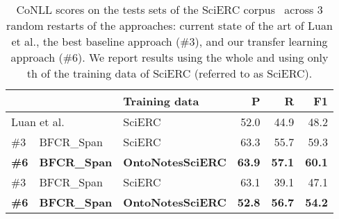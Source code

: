 \documentclass[runningheads]{llncs}
\begin{document}
\begin{table}[tb]
\centering
\small
\caption{CoNLL scores on the tests sets of the SciERC corpus~\cite{Luan2018MultiTaskIO} across 3 random restarts of the approaches: current state of the art of Luan et al., 
the best baseline approach (\#3), and our transfer learning approach (\#6). We report results using the whole and using only th of the training data of SciERC (referred to as SciERC).}
\label{tab:coref_results_scierc}
\begin{tabular}{lll|rrr}
  &           & Training data  & P       & R      & F1     \\ \hline
\multicolumn{2}{l}{ Luan et al.~\cite{Luan2018MultiTaskIO}} & SciERC 
 &  52.0 & 44.9 & 48.2 \\ \hline
\#3 & BFCR\_Span & SciERC 
 & 63.3	& 55.7	& 59.3 \\ 
\textbf{\#6} & \textbf{BFCR\_Span} & \textbf{OntoNotesSciERC}
& \textbf{63.9}	& \textbf{57.1}	& \textbf{60.1} \\
\hline
\#3 & BFCR\_Span & SciERC 
& 63.1	& 39.1	& 47.1 \\
\textbf{\#6} & \textbf{BFCR\_Span} & \textbf{OntoNotesSciERC} & \textbf{52.8}	& \textbf{56.7}	& \textbf{54.2} \\
\end{tabular}
\vspace{-1em}
\end{table}


\begin{comment}
\begin{table}[tb]
\centering
\small
\caption{
Per domain and overall performance results of the best transfer learning approach (\#6) on the test sets of the STM corpus across five-fold cross validation, i.e.
CoNLL precision (P), recall (R) and F1.}
\label{tab:results_per_domain}
\begin{tabular}{l|r|r|r|r|r|r|r|r|r|r|r}
   & Agr  & Ast  & Bio  & Che  & CS   & ES   & Eng  & MS   & Mat  & Med & Overall  \\ \hline
 P & 65.5 & 57.5 & 53.4 & 60.8 & 82.4 & 62.1 & 60.7 & 53.1 & 53.5 & 66.2 & 62.0 \\
 R & 60.9 & 66.4 & 63.5 & 53.6 & 69.1 & 55.8 & 59.9 & 54.1 & 61.3 & 59.2 & 61.0 \\
 F1 & 62.8 & 61.1 & 57.5 & 56.3 & 74.9 & 57.5 & 59.8 & 52.1 & 55.7 & 62.1 & 61.4
\end{tabular}
\end{table}
\end{comment}
\end{document}
